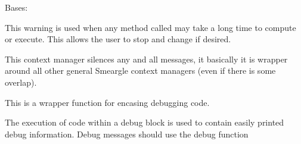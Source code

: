 \documentclass[letterpaper,10pt,english]{sphinxmanual}
\begin{document}

\begin{fulllineitems}
\label{\detokenize{python_docstrings/IfA_Smeargle.meta.errors:IfA_Smeargle.meta.errors.TimeWarning}}
Bases: {\hyperref[\detokenize{python_docstrings/IfA_Smeargle.meta.errors:IfA_Smeargle.meta.errors.Smeargle_Warning}]{}}

This warning is used when any method called may take a long time to
compute or execute. This allows the user to stop and change if desired.

\end{fulllineitems}


\begin{fulllineitems}
\label{\detokenize{python_docstrings/IfA_Smeargle.meta.errors:IfA_Smeargle.meta.errors.smeargle_absolute_silence}}
This context manager silences any and all messages, it basically
it is wrapper around all other general Smeargle context managers (even
if there is some overlap).

\end{fulllineitems}


\begin{fulllineitems}
\label{\detokenize{python_docstrings/IfA_Smeargle.meta.errors:IfA_Smeargle.meta.errors.smeargle_debug_block}}
This is a wrapper function for encasing debugging code.

The execution of code within a debug block is used to contain easily
printed debug information. Debug messages should use the debug function
{\hyperref[\detokenize{python_docstrings/IfA_Smeargle.meta.errors:IfA_Smeargle.meta.errors.smeargle_debug_message}]{}}

\end{fulllineitems}
\end{document}
